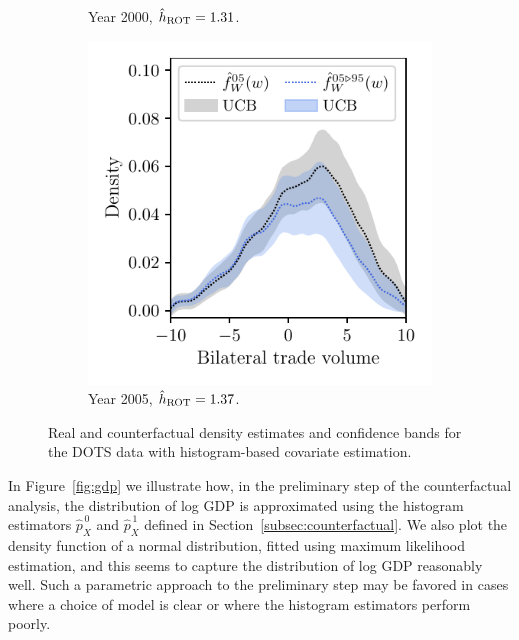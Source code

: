 \begin{figure}[ht]
\begin{subfigure}{0.32\textwidth}
    \caption{Year 2000, $\hat h_{\operatorname{ROT}} = 1.31$.}
  \end{subfigure}
  \begin{subfigure}{0.32\textwidth}
    \centering
    \includegraphics[scale=0.64]{graphics/trade_plot_1995_2005.pdf}
    \caption{Year 2005, $\hat h_{\operatorname{ROT}} = 1.37$.}
  \end{subfigure}
  \caption[Histogram-based estimation and inference for the DOTS data]{
    Real and counterfactual density estimates and confidence bands for
  the DOTS data with histogram-based covariate estimation.}
  \label{fig:trade}
\end{figure}

In Figure~\ref{fig:gdp} we illustrate how, in the preliminary step of the
counterfactual analysis, the distribution of log GDP is approximated using the
histogram estimators $\hat p_X^{\,0}$ and $\hat p_X^{\,1}$ defined in
Section~\ref{subsec:counterfactual}. We also plot the density function of a
normal distribution, fitted using maximum likelihood estimation, and this seems
to capture the distribution of log GDP reasonably well. Such a parametric
approach to the preliminary step may be favored in cases where a choice of
model is clear or where the histogram estimators perform poorly.

